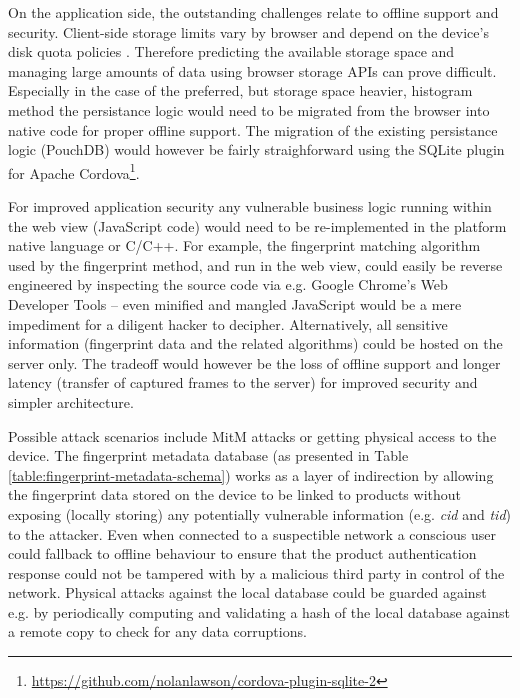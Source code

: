 \documentclass[thesis.tex]{subfiles}
\begin{document}
On the application side, the outstanding challenges relate to offline support and security. Client-side storage limits vary by browser and depend on the device's disk quota policies \cite{mobile-browser-quota}. Therefore predicting the available storage space and managing large amounts of data using browser storage APIs can prove difficult. Especially in the case of the preferred, but storage space heavier, histogram method the persistance logic would need to be migrated from the browser into native code for proper offline support. The migration of the existing persistance logic (PouchDB) would however be fairly straighforward using the SQLite plugin for Apache Cordova\footnote{\url{https://github.com/nolanlawson/cordova-plugin-sqlite-2}}.

For improved application security any vulnerable business logic running within the web view (JavaScript code) would need to be re-implemented in the platform native language or C/C++. For example, the fingerprint matching algorithm used by the fingerprint method, and run in the web view, could easily be reverse engineered by inspecting the source code via e.g. Google Chrome's Web Developer Tools -- even minified and mangled JavaScript would be a mere impediment for a diligent hacker to decipher. Alternatively, all sensitive information (fingerprint data and the related algorithms) could be hosted on the server only. The tradeoff would however be the loss of offline support and longer latency (transfer of captured frames to the server) for improved security and simpler architecture.

Possible attack scenarios include MitM attacks or getting physical access to the device. The fingerprint metadata database (as presented in Table \ref{table:fingerprint-metadata-schema}) works as a layer of indirection by allowing the fingerprint data stored on the device to be linked to products without exposing (locally storing) any potentially vulnerable information (e.g. \emph{cid} and \emph{tid}) to the attacker. Even when connected to a suspectible network a conscious user could fallback to offline behaviour to ensure that the product authentication response could not be tampered with by a malicious third party in control of the network. Physical attacks against the local database could be guarded against e.g. by periodically computing and validating a hash of the local database against a remote copy to check for any data corruptions.
\end{document}
